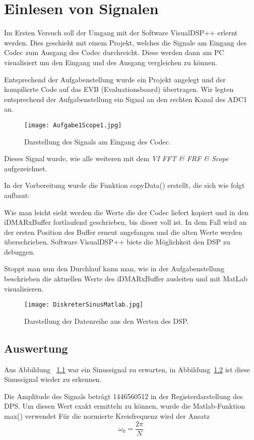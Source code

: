 \chapter{Einlesen von Signalen}
Im Ersten Versuch soll der Umgang mit der Software VisualDSP++ erlernt werden. 
Dies geschieht mit einem Projekt, welches die Signale am Eingang des Codec zum 
Ausgang des Codec durchreicht. Diese werden dann am PC visualisiert um den Eingang und des Ausgang vergleichen zu können.\\\par 

Entsprechend der Aufgabenstellung wurde ein Projekt angelegt und der kompilierte Code auf das EVB (Evaluationsboard) übertragen. 
Wir legten entsprechend der Aufgabenstellung ein Signal an den rechten Kanal des ADC1 an. 


\begin{figure}[bp!]
  \centering
    \texttt{[image: Aufgabe1Scope1.jpg]}
  \caption{Darstellung des Signals am Eingang des Codec.}
  \label{fig:SinusFunktionsGen}
\end{figure}


Dieses Signal wurde, wie alle weiteren mit dem \textit{VI FFT \& FRF \& Scope} 
aufgezeichnet.\pagebreak

In der Vorbereitung wurde die Funktion copyData() erstellt, die sich wie folgt 
aufbaut:
\begin{adjustbox}{width=\textwidth,keepaspectratio}

\end{adjustbox}

Wie man leicht sieht werden die Werte die der Codec liefert kopiert und in den iDMARxBuffer 
fortlaufend geschrieben, bis dieser voll ist. 
In dem Fall wird an der ersten Position des Buffer erneut angefangen und die alten Werte werden überschrieben.
Software VisualDSP++ biete die Möglichkeit den DSP zu debuggen.\pagebreak


Stoppt man nun den Durchlauf kann man, wie in der Aufgabenstellung beschrieben 
die aktuellen Werte des iDMARxBuffer ausleiten und mit MatLab visualisieren. 
\begin{figure}[!htb]
  \centerline{
    \texttt{[image: DiskreterSinusMatlab.jpg]}}
      \caption{Darstellung der Datenreihe aus den Werten des DSP.}
      \label{fig:SinusMatlab}
\end{figure}

\section{Auswertung}
Aus Abbildung ~\ref{fig:SinusFunktionsGen} war ein Sinussignal zu erwarten, in Abbildung~\ref{fig:SinusMatlab} ist diese Sinussignal wieder zu erkennen.\\\par
Die Amplitude des Signals beträgt 1446560512 in der Registerdarstellung des DPS. Um diesen Wert exakt ermitteln zu können, wurde die Matlab-Funktion max() 
verwendet
Für die normierte Kreisfrequenz wird der Ansatz 
\begin{equation}\label{normierteKreisfrequenz}
 \omega_0=\frac{2\pi}N 
\end{equation}  

